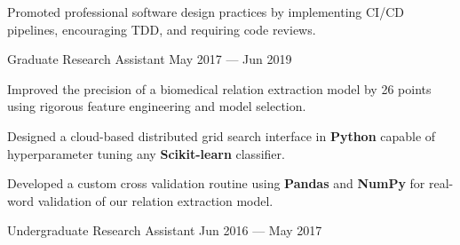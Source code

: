 \begin{cventries}
{\begin{cvitems}
        \item Promoted professional software design practices by implementing CI/CD pipelines, encouraging TDD, and requiring code reviews.
      \end{cvitems}
    }
    \vspace{.07cm}
  \cventry
    {Graduate Research Assistant} %
    {} %
    {} %
    {May 2017 --- Jun 2019} %
    {
      \vspace{-0.1cm}
      \begin{cvitems} %
        \item Improved the precision of a biomedical relation extraction model by 26 points using rigorous feature engineering and model selection.
        \item Designed a cloud-based distributed grid search interface in \textbf{Python} capable of hyperparameter tuning any \textbf{Scikit-learn} classifier.
        \item Developed a custom cross validation routine using \textbf{Pandas} and \textbf{NumPy} for real-word validation of our relation extraction model.
      \end{cvitems}
    }
    \vspace{.07cm}
  \cventry
    {Undergraduate Research Assistant} %
    {} %
    {} %
    {Jun 2016 --- May 2017} %
    {
      \vspace{-0.1cm}
}
\end{cventries}
